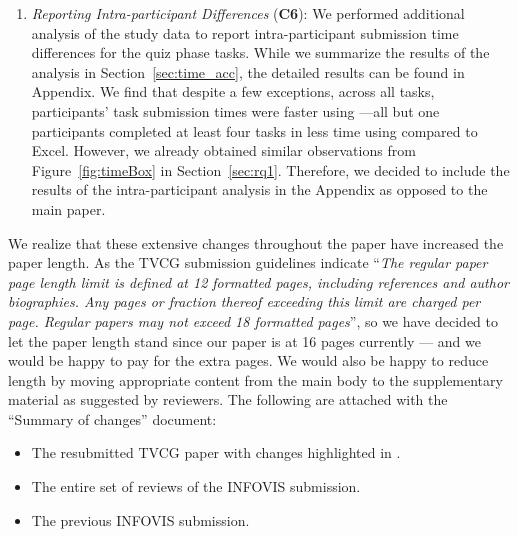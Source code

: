 \begin{enumerate}
\item \textit{Reporting Intra-participant Differences} (\textbf{C6}):
We performed additional analysis of the study data to report intra-participant submission time differences for the quiz phase tasks. While we summarize the results of the analysis in Section~\ref{sec:time_acc}, the detailed results can be found in Appendix. We find that despite a few exceptions, across all tasks, participants' task submission times were faster using \noah---all but one participants completed at least four tasks in less time using \noah compared to Excel. However, we already obtained similar observations from Figure~\ref{fig:timeBox} in Section~\ref{sec:rq1}. Therefore, we decided to include the results of the intra-participant analysis in the Appendix as opposed to the main paper.
\end{enumerate}


We realize that these extensive changes throughout the paper have increased the paper length. As the TVCG submission guidelines indicate ``\emph{The regular paper page length limit is defined at 12 formatted
pages, including references and author biographies. Any pages or
fraction thereof exceeding this limit are charged  per page. Regular
papers may not exceed 18 formatted pages}'', so we have decided to let the paper length stand since our paper is at 16 pages currently — and we would be happy to pay for the extra pages. We would also be happy to reduce length by moving appropriate content from the main body to the supplementary material as suggested by reviewers. The following are attached with the ``Summary of changes'' document:
\begin{itemize}
    \item The resubmitted TVCG paper with changes highlighted in .
    \item The entire set of reviews of the INFOVIS submission.
    \item The previous INFOVIS submission.
\end{itemize}
